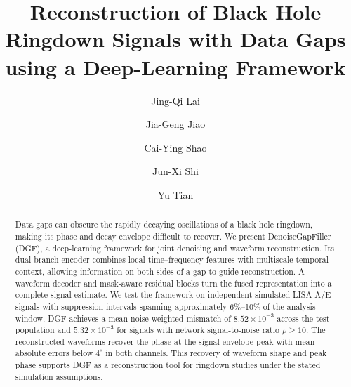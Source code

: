 \documentclass[10pt,prd,aps,a4paper,twocolumn,superscriptaddress,nofootinbib,floatfix]{revtex4-2}
\begin{document}
\title{Reconstruction of Black Hole Ringdown Signals with Data Gaps using a Deep-Learning Framework}
\author{Jing-Qi Lai}
\author{Jia-Geng Jiao}
\author{Cai-Ying Shao}

\author{Jun-Xi Shi}
\author{Yu Tian}

\begin{abstract}
Data gaps can obscure the rapidly decaying oscillations of a black hole ringdown, making its phase and decay envelope difficult to recover. We present DenoiseGapFiller (DGF), a deep-learning framework for joint denoising and waveform reconstruction. Its dual-branch encoder combines local time--frequency features with multiscale temporal context, allowing information on both sides of a gap to guide reconstruction. A waveform decoder and mask-aware residual blocks turn the fused representation into a complete signal estimate. We test the framework on independent simulated LISA A/E signals with suppression intervals spanning approximately 6\%--10\% of the analysis window. DGF achieves a mean noise-weighted mismatch of $8.52\times10^{-3}$ across the test population and $5.32\times10^{-3}$ for signals with network signal-to-noise ratio $\rho\ge10$. The reconstructed waveforms recover the phase at the signal-envelope peak with mean absolute errors below $4^\circ$ in both channels. This recovery of waveform shape and peak phase supports DGF as a reconstruction tool for ringdown studies under the stated simulation assumptions.
\end{abstract}

\maketitle
\end{document}
